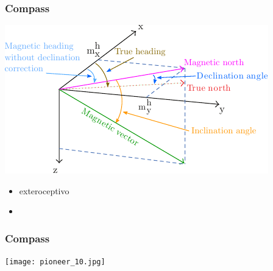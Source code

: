 \begin{frame}
    \frametitle{Compass}

    \begin{center}
        \includegraphics[width=0.5\columnwidth]{images/magnetic_field.pdf}
    \end{center}

    \begin{itemize}
        \item exteroceptivo
        \item
    \end{itemize}
\end{frame}

\begin{frame}
    \frametitle{Compass}

    \begin{center}
        \texttt{[image: pioneer\_10.jpg]}
    \end{center}
\end{frame}